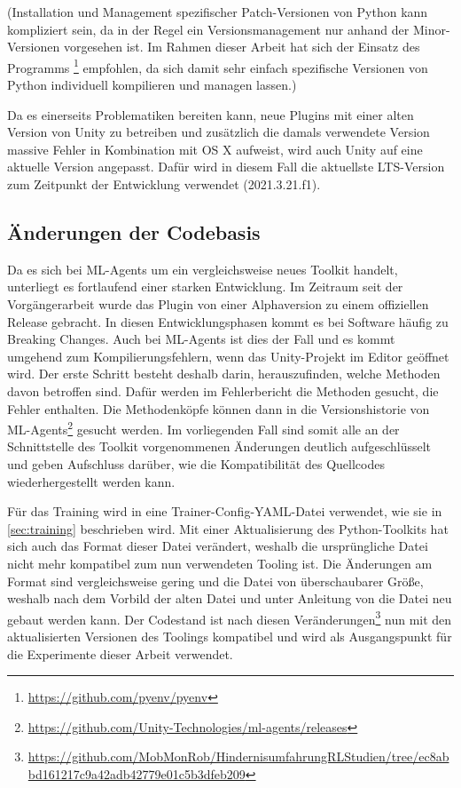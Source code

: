 (Installation und Management spezifischer Patch-Versionen von Python kann kompliziert sein, da in der Regel ein Versionsmanagement nur anhand der Minor-Versionen vorgesehen ist.
Im Rahmen dieser Arbeit hat sich der Einsatz des Programms \footnote{\url{https://github.com/pyenv/pyenv}} empfohlen, da sich damit sehr einfach spezifische Versionen von Python individuell kompilieren und managen lassen.)

Da es einerseits Problematiken bereiten kann, neue Plugins mit einer alten Version von Unity zu betreiben und zusätzlich die damals verwendete Version massive Fehler in Kombination mit OS X aufweist, wird auch Unity auf eine aktuelle Version angepasst.
Dafür wird in diesem Fall die aktuellste LTS-Version zum Zeitpunkt der Entwicklung verwendet (2021.3.21.f1).

\subsection{Änderungen der Codebasis}
Da es sich bei ML-Agents um ein vergleichsweise neues Toolkit handelt, unterliegt es fortlaufend einer starken Entwicklung.
Im Zeitraum seit der Vorgängerarbeit wurde das Plugin von einer Alphaversion zu einem offiziellen Release gebracht.
In diesen Entwicklungsphasen kommt es bei Software häufig zu Breaking Changes.
Auch bei ML-Agents ist dies der Fall und es kommt umgehend zum Kompilierungsfehlern, wenn das Unity-Projekt im Editor geöffnet wird.
Der erste Schritt besteht deshalb darin, herauszufinden, welche Methoden davon betroffen sind.
Dafür werden im Fehlerbericht die Methoden gesucht, die Fehler enthalten.
Die Methodenköpfe können dann in die Versionshistorie von ML-Agents\footnote{\url{https://github.com/Unity-Technologies/ml-agents/releases}} gesucht werden.
Im vorliegenden Fall sind somit alle an der Schnittstelle des Toolkit vorgenommenen Änderungen deutlich aufgeschlüsselt und geben Aufschluss darüber, wie die Kompatibilität des Quellcodes wiederhergestellt werden kann.

Für das Training wird in \cite{waidner.2020} eine Trainer-Config-YAML-Datei verwendet, wie sie in \autoref{sec:training} beschrieben wird.
Mit einer Aktualisierung des Python-Toolkits hat sich auch das Format dieser Datei verändert, weshalb die ursprüngliche Datei nicht mehr kompatibel zum nun verwendeten Tooling ist.
Die Änderungen am Format sind vergleichsweise gering und die Datei von überschaubarer Größe, weshalb nach dem Vorbild der alten Datei und unter Anleitung von \cite{mlagentsHyperparameter} die Datei neu gebaut werden kann.
Der Codestand ist nach diesen Veränderungen\footnote{\url{https://github.com/MobMonRob/HindernisumfahrungRLStudien/tree/ec8abbd161217c9a42adb42779e01c5b3dfeb209}} nun mit den aktualisierten Versionen des Toolings kompatibel und wird als Ausgangspunkt für die Experimente dieser Arbeit verwendet.

